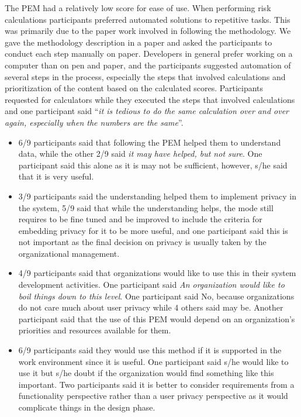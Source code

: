 \documentclass{sigchi}
\begin{document}
The PEM had a relatively low score for ease of use. When performing risk calculations participants preferred automated solutions to repetitive tasks. This was primarily due to the paper work involved in following the methodology. We gave the methodology description in a paper and asked the participants to conduct each step manually on paper. Developers in general prefer working on a computer than on pen and paper, and the participants suggested automation of several steps in the process, especially the steps that involved calculations and prioritization of the content based on the calculated scores. Participants requested for calculators while they executed the steps that involved calculations and one participant said \enquote{\textit {it is tedious to do the same calculation over and over again, especially when the numbers are the same}}. 

\begin{itemize}
\item 6/9 participants said that following the PEM helped them to understand data, while the other 2/9 said \textit{it may have helped, but not sure}. One participant said this alone as it is may not be sufficient, however, s/he said that it is very useful. 
\item 3/9 participants said the understanding helped them to implement privacy in the system, 5/9 said that while the understanding helps, the mode still requires to be fine tuned and be improved to include the criteria for embedding privacy for it to be more useful, and one participant said this is not important as the final decision on privacy is usually taken by the organizational management.
\item 4/9 participants said that organizations would like to use this in their system development activities. One participant said \textit{An organization would like to boil things down to this level}. One participant said No, because organizations do not care much about user privacy while 4 others said may be. Another participant said that the use of this PEM would depend on an organization's priorities and resources available for them.
\item 6/9 participants said they would use this method if it is supported in the work environment since it is useful. One participant said s/he would like to use it but s/he doubt if the organization would find something like this important. Two participants said it is better to consider requirements from a functionality perspective rather than a user privacy perspective as it would complicate things in the design phase.
\end{itemize}
\end{document}
